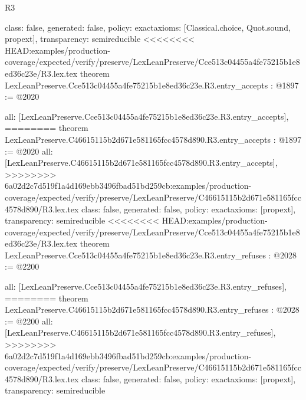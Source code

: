 \begin{lexlean}{R3}
\begin{coremodule}
{{{{{{{{{{{{{{{  class: false,
  generated: false,
  policy: exact{axioms: [Classical.choice, Quot.sound, propext]},
  transparency: semireducible
}
<<<<<<<< HEAD:examples/production-coverage/expected/verify/preserve/LexLeanPreserve/Cce513c04455a4fe75215b1e8ed36c23e/R3.lex.tex
theorem LexLeanPreserve.Cce513c04455a4fe75215b1e8ed36c23e.R3.entry_accepts : @1897 := @2020 {
  all: [LexLeanPreserve.Cce513c04455a4fe75215b1e8ed36c23e.R3.entry_accepts],
========
theorem LexLeanPreserve.C46615115b2d671e581165fcc4578d890.R3.entry_accepts : @1897 := @2020 {
  all: [LexLeanPreserve.C46615115b2d671e581165fcc4578d890.R3.entry_accepts],
>>>>>>>> 6a02d2c7d519f1a4d169ebb3496fbad51bd259cb:examples/production-coverage/expected/verify/preserve/LexLeanPreserve/C46615115b2d671e581165fcc4578d890/R3.lex.tex
  class: false,
  generated: false,
  policy: exact{axioms: [propext]},
  transparency: semireducible
}
<<<<<<<< HEAD:examples/production-coverage/expected/verify/preserve/LexLeanPreserve/Cce513c04455a4fe75215b1e8ed36c23e/R3.lex.tex
theorem LexLeanPreserve.Cce513c04455a4fe75215b1e8ed36c23e.R3.entry_refuses : @2028 := @2200 {
  all: [LexLeanPreserve.Cce513c04455a4fe75215b1e8ed36c23e.R3.entry_refuses],
========
theorem LexLeanPreserve.C46615115b2d671e581165fcc4578d890.R3.entry_refuses : @2028 := @2200 {
  all: [LexLeanPreserve.C46615115b2d671e581165fcc4578d890.R3.entry_refuses],
>>>>>>>> 6a02d2c7d519f1a4d169ebb3496fbad51bd259cb:examples/production-coverage/expected/verify/preserve/LexLeanPreserve/C46615115b2d671e581165fcc4578d890/R3.lex.tex
  class: false,
  generated: false,
  policy: exact{axioms: [propext]},
  transparency: semireducible
}

}}}}}}}}}}}}}}}}
\end{coremodule}
\end{lexlean}

